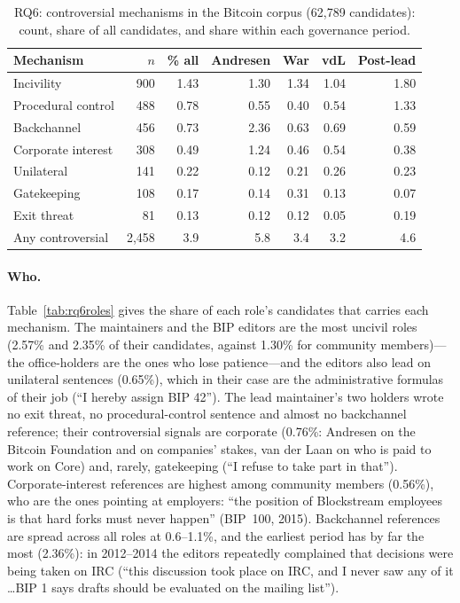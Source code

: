 \documentclass[sigconf,screen]{acmart}
\begin{document}
\begin{table}[t]
\caption{RQ6: controversial mechanisms in the Bitcoin corpus (62,789 candidates): count, share of all candidates, and share within each governance period.}
\label{tab:rq6}
\footnotesize
\setlength{\tabcolsep}{3.5pt}
\begin{tabular}{lrrrrrr}
\toprule
Mechanism & $n$ & \% all & Andresen & War & vdL & Post-lead \\
\midrule
Incivility & 900 & 1.43 & 1.30 & 1.34 & 1.04 & 1.80 \\
Procedural control & 488 & 0.78 & 0.55 & 0.40 & 0.54 & 1.33 \\
Backchannel & 456 & 0.73 & 2.36 & 0.63 & 0.69 & 0.59 \\
Corporate interest & 308 & 0.49 & 1.24 & 0.46 & 0.54 & 0.38 \\
Unilateral & 141 & 0.22 & 0.12 & 0.21 & 0.26 & 0.23 \\
Gatekeeping & 108 & 0.17 & 0.14 & 0.31 & 0.13 & 0.07 \\
Exit threat & 81 & 0.13 & 0.12 & 0.12 & 0.05 & 0.19 \\
\midrule
Any controversial & 2,458 & 3.9 & 5.8 & 3.4 & 3.2 & 4.6 \\
\bottomrule
\end{tabular}
\end{table}

\paragraph{Who.} Table~\ref{tab:rq6roles} gives the share of each role's candidates that carries each mechanism. The maintainers and the BIP editors are the most uncivil roles (2.57\% and 2.35\% of their candidates, against 1.30\% for community members)---the office-holders are the ones who lose patience---and the editors also lead on unilateral sentences (0.65\%), which in their case are the administrative formulas of their job (``I hereby assign BIP 42''). The lead maintainer's two holders wrote no exit threat, no procedural-control sentence and almost no backchannel reference; their controversial signals are corporate (0.76\%: Andresen on the Bitcoin Foundation and on companies' stakes, van der Laan on who is paid to work on Core) and, rarely, gatekeeping (``I refuse to take part in that''). Corporate-interest references are highest among community members (0.56\%), who are the ones pointing at employers: ``the position of Blockstream employees is that hard forks must never happen'' (BIP~100, 2015). Backchannel references are spread across all roles at 0.6--1.1\%, and the earliest period has by far the most (2.36\%): in 2012--2014 the editors repeatedly complained that decisions were being taken on IRC (``this discussion took place on IRC, and I never saw any of it \ldots BIP 1 says drafts should be evaluated on the mailing list'').
\end{document}
